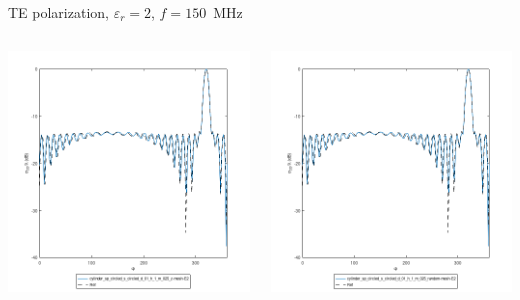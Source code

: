 \begin{frame}{TE polarization, $\varepsilon_r=2$, $f=150$\, MHz}
\begin{columns}

\includegraphics[width=\linewidth]{results/FF/cylD_01_H_1_M_025_Z/epr2_TE_f150_norm.png}


\includegraphics[width=\linewidth]{results/FF/cylD_01_H_1_M_025_RANDOM/epr2_TE_f150_norm.png}

\end{columns}

\end{frame}

